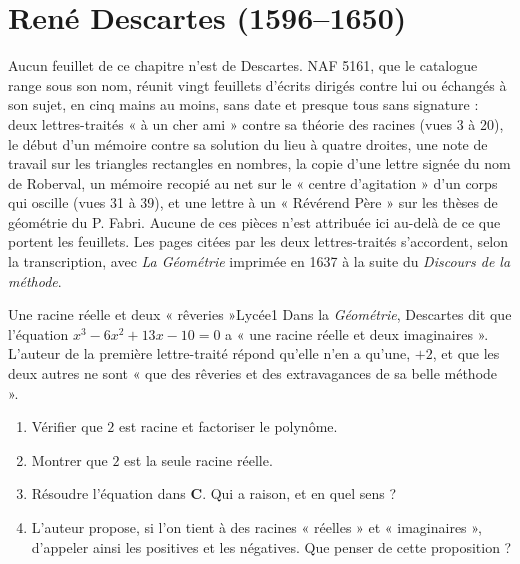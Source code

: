 \documentclass[11pt,a4paper]{article}
\begin{document}
\section*{René Descartes (1596--1650)}

Aucun feuillet de ce chapitre n'est de Descartes. NAF 5161, que le catalogue
range sous son nom, réunit vingt feuillets d'écrits dirigés contre lui ou
échangés à son sujet, en cinq mains au moins, sans date et presque tous sans
signature : deux lettres-traités « à un cher ami » contre sa théorie des racines
(vues 3 à 20), le début d'un mémoire contre sa solution du lieu à quatre droites,
une note de travail sur les triangles rectangles en nombres, la copie d'une
lettre signée du nom de Roberval, un mémoire recopié au net sur le « centre
d'agitation » d'un corps qui oscille (vues 31 à 39), et une lettre à un
« Révérend Père » sur les thèses de géométrie du P. Fabri. Aucune de ces pièces
n'est attribuée ici au-delà de ce que portent les feuillets. Les pages citées par
les deux lettres-traités s'accordent, selon la transcription, avec \emph{La
Géométrie} imprimée en 1637 à la suite du \emph{Discours de la méthode}.

\begin{exercice}{Une racine réelle et deux « rêveries »}{Lycée}{1}
Dans la \emph{Géométrie}, Descartes dit que l'équation
$x^3 - 6x^2 + 13x - 10 = 0$ a « une racine réelle et deux imaginaires ». L'auteur
de la première lettre-traité répond qu'elle n'en a qu'une, $+2$, et que les deux
autres ne sont « que des rêveries et des extravagances de sa belle méthode ».
\begin{enumerate}
\item Vérifier que $2$ est racine et factoriser le polynôme.
\item Montrer que $2$ est la seule racine réelle.
\item Résoudre l'équation dans $\mathbf{C}$. Qui a raison, et en quel sens ?
\item L'auteur propose, si l'on tient à des racines « réelles » et « imaginaires »,
  d'appeler ainsi les positives et les négatives. Que penser de cette proposition ?
\end{enumerate}
\end{exercice}
\end{document}
